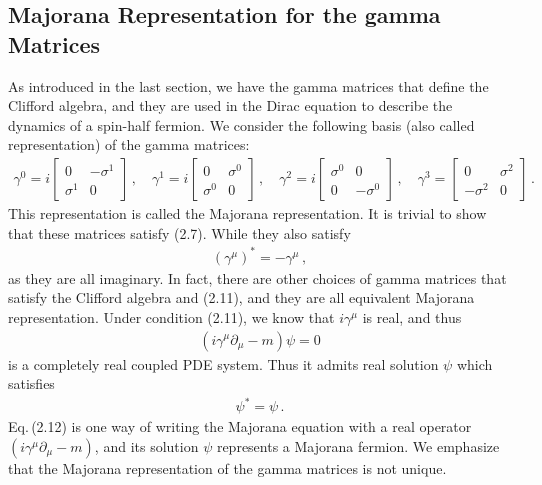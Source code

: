 \documentclass[11pt, oneside]{book}
\theoremstyle{break}
\theoremstyle{break}
\newcommand{\pd}{\partial}
\newcommand{\bmat}[1]{\begin{bmatrix} #1 \end{bmatrix}}
\begin{document}
\subsection{Majorana Representation for the gamma Matrices}
As introduced in the last section, we have the gamma matrices that define the Clifford algebra, and they are used in the Dirac equation to describe the dynamics of a spin-half fermion. We consider the following basis (also called representation) of the gamma matrices:
\begin{align}
{\gamma}^0 = i \bmat{0 & -\sigma^1\\ \sigma^1 & 0}\,,\quad
{\gamma}^1 = i \bmat{0 & \sigma^0\\ \sigma^0 & 0}\,,\quad
{\gamma}^2 = i\bmat{\sigma^0 & 0 \\ 0 & -\sigma^0 }\,,\quad
{\gamma}^3 = \bmat{0& \sigma^2 \\ -\sigma^2&0 }\,.
\end{align}
This representation is called the Majorana representation. 
It is trivial to show that these matrices satisfy (2.7). While they also satisfy
\begin{align}
(\gamma^\mu)^* = -\gamma^\mu\,,
\end{align}
as they are all imaginary. In fact, there are other choices of gamma matrices that satisfy the Clifford algebra and (2.11), and they are all equivalent Majorana representation. Under condition (2.11), we know that $i\gamma^\mu$ is real, and thus 
\begin{align}
(i\gamma^\mu \pd_\mu - m) \psi = 0
\end{align}
is a completely real coupled PDE system. Thus it admits real solution $\psi$ which satisfies 
\begin{align}
\psi^* = \psi\,.
\end{align}
Eq.\,(2.12) is one way of writing the Majorana equation with a real operator $(i\gamma^\mu \pd_\mu - m)$, and its solution $\psi$ represents a Majorana fermion. We emphasize that the Majorana representation of the gamma matrices is not unique.\\
\end{document}
